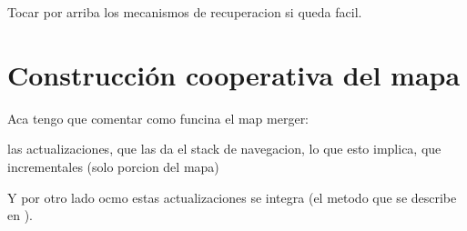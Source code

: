 Tocar por arriba los mecanismos de recuperacion si queda facil.

\section{Construcción cooperativa del mapa}
Aca tengo que comentar como funcina el map merger:

las actualizaciones, que las da el stack de navegacion, lo que esto implica, que incrementales (solo porcion del mapa) 

Y por otro lado ocmo estas actualizaciones se integra (el metodo que se describe en \cite{stachniss2009robotic}).


















